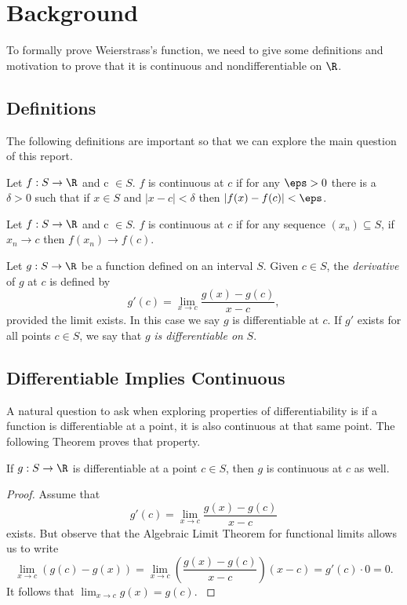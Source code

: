 \documentclass[fontsize=14pt]{scrartcl}
\begin{document}
\newpage
\section{Background}
To formally prove Weierstrass's function, we need to give some definitions and motivation to prove that it is continuous and nondifferentiable on $\R$. 

\subsection*{Definitions}
The following definitions are important so that we can explore the main question of this report. 
\begin{definition}[Continuity]
    Let $f: S \to \R$ and c $\in S$. $f$ is continuous at $c$ if for any $\eps > 0$ there is a $\delta > 0$ such that if $x \in S$ and $|x-c|<\delta$ then $|f(x) - f(c)|<\eps$. \cite{Abbott2015}
\end{definition}

\begin{definition}
    Let $f: S \to \R$ and c $\in S$. $f$ is continuous at $c$ if for any sequence $(x_n) \subseteq S$, if $x_n \to c$ then $f(x_n) \to f(c).$ \cite{ClassNotes}
\end{definition}

\begin{definition}[Differentiability]
    Let $g:S \to \R$ be a function defined on an interval $S$. Given $c \in S$, the \textit{derivative} of $g$ at $c$ is defined by  \[ g'(c) = \lim_{x\to c} \frac{g(x)-g(c)}{x-c},\]
    provided the limit exists. In this case we say $g$ is differentiable at $c$. If $g'$ exists for all points $c\in S$, we say that $g$ \textit{is differentiable on} $S$. \cite{Abbott2015}
\end{definition}

\subsection*{Differentiable Implies Continuous}
A natural question to ask when exploring properties of differentiability is if a function is differentiable at a point, it is also continuous at that same point. The following Theorem proves that property.
\begin{theorem}
    If $g:S \to \R$ is differentiable at a point $c\in S$, then $g$ is continuous at $c$ as well. 
\end{theorem}
\begin{proof}
    Assume that
    \[ g'(c) = \lim_{x\to c} \frac{g(x)-g(c)}{x-c}\]
    exists. But observe that the Algebraic Limit Theorem for functional limits allows us to write 
    \[\lim_{x \to c}(g(c)-g(x)) = \lim_{x\to c} \left( \frac{g(x)-g(c)}{x-c}\right)(x-c) = g'(c) \cdot 0 = 0.\]
    It follows that $\lim_{x\to c} g(x)=g(c).$ \cite{Abbott2015}
\end{proof}
\newpage
\end{document}
